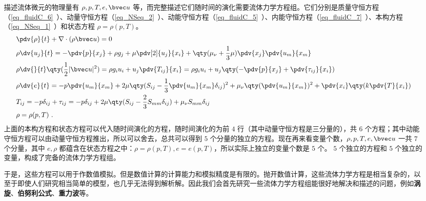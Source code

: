 

描述流体微元的物理量有 $\rho,p,T,e,\bvec u$ 等，而完整描述它们随时间的演化需要流体力学方程组。它们分别是质量守恒方程（\autoref{eq_fluidC_6}~）、动量守恒方程（\autoref{eq_NSeq_2}~）、动能守恒方程（\autoref{eq_fluidC_5}~）、内能守恒方程（\autoref{eq_fluidC_7}~）、本构方程（\autoref{eq_NSeq_1}~）和状态方程 $\rho=\rho(p,T)$。
\begin{equation}
\begin{aligned}
&\pdv{\rho}{t}+\nabla\cdot(\rho\bvec u)=0\\
&
\rho \dv{u_j}{t}=-\pdv{p}{x_j}+\rho g_j+\mu\pdv[2]{u_j}{x_i} +\qty(\mu_\nu+\frac{1}{3}\mu)\pdv{x_j}\pdv{u_m}{x_m}\\
&\rho \dv{}{t}\qty(\frac{1}{2}|\bvec u|^2)=\rho g_iu_i+u_j\pdv{T_{ij}}{x_i}=\rho g_iu_i+u_j\qty(-\pdv{p}{x_j}+\pdv{\tau_{ij}}{x_i})\\
&\rho \dv{e}{t}=-p\pdv{u_m}{x_m}+2\mu\qty(S_{ij}-\frac{1}{3}\pdv{u_m}{x_m}\delta_{ij})^2+\mu_\nu\qty(\pdv{u_m}{x_m})^2+\pdv{x_i}\qty(k\pdv{T}{x_i})
\\
&T_{ij}=-p\delta_{ij}+\tau_{ij}=-p\delta_{ij}+2\mu \qty(S_{ij}-\frac{2}{3}S_{mm}\delta_{ij})+\mu_\nu S_{mm} \delta_{ij}\\
&\rho=\rho(p,T)~.
\end{aligned}
\end{equation}
上面的本构方程和状态方程可以代入随时间演化的方程，随时间演化的为前 $4$ 行（其中动量守恒方程是三分量的），共 $6$ 个方程；其中动能守恒方程可以由动量守恒方程推出，所以可以舍去，总共可以得到 $5$ 个分量的独立的方程。现在再来看变量个数，$\rho,p,T,e,\bvec u$ 一共 $7$ 个分量，其中 $e,\rho$ 都蕴含在状态方程之中：$\rho=\rho(p,T),e=e(p,T)$，所以实际上独立的变量个数是 $5$ 个。 $5$ 个独立的方程和 $5$ 个独立的变量，构成了完备的流体力学方程组。

于是，这些方程可以用于作数值模拟。但是数值计算的计算能力和模拟精度是有限的。抛开数值计算，这些流体力学方程是相当复杂的，以至于即使人们研究相当简单的模型，也几乎无法得到解析解。因此我们会首先研究一些流体力学方程组能很好地解决和描述的问题，例如\textbf{涡旋}、\textbf{伯努利公式}、\textbf{重力波}等。
